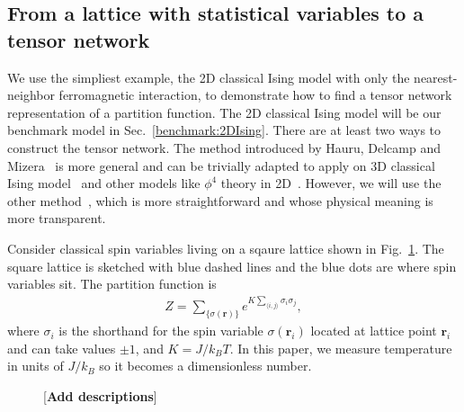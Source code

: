 \documentclass[aps,prb,reprint,superscriptaddress]{revtex4-2}
\begin{document}
\subsection{From a lattice with statistical variables to a tensor
network\label{spin2tensor}}
We use the simpliest example, the 2D classical Ising model with only the
nearest-neighbor ferromagnetic interaction, to demonstrate how to find a
tensor network representation of a partition function. The 2D classical
Ising model will be our benchmark model in Sec.~\ref{benchmark:2DIsing}.
There are at least two ways to construct the tensor network. The method
introduced by Hauru, Delcamp and Mizera~\cite{gilts} is more general and
can be trivially adapted to apply on 3D classical Ising
model~\cite{hotrg} and other models like $\phi^4$ theory in
2D~\cite{Delcamp2020}. However, we will use the other method~\cite{trg,
tnr}, which is more straightforward and whose physical meaning is more
transparent.
%

Consider classical spin variables living on a sqaure lattice shown in
Fig.~\ref{fig:spin2tensor}. The square lattice is sketched with blue
dashed lines and the blue dots are where spin variables sit. The
partition function is
%
\begin{align}\label{eq:2DIsingZ}
    Z = \sum_{\{\sigma(\mathbf{r})\}}e^{K\sum_{\langle i,j
        \rangle}\sigma_i \sigma_j},
\end{align}
where $\sigma_i$ is the shorthand for the spin variable
$\sigma(\mathbf{r}_i)$ located at lattice point $\mathbf{r}_i$ and can
take values $\pm 1$, and $K = J / k_B T$. In this paper, we measure
temperature in units of $J / k_B $ so it becomes a dimensionless number.
\begin{figure}[htb]
    \caption{\label{fig:spin2tensor}[\textbf{Add descriptions}]}
\end{figure}
%
\end{document}
